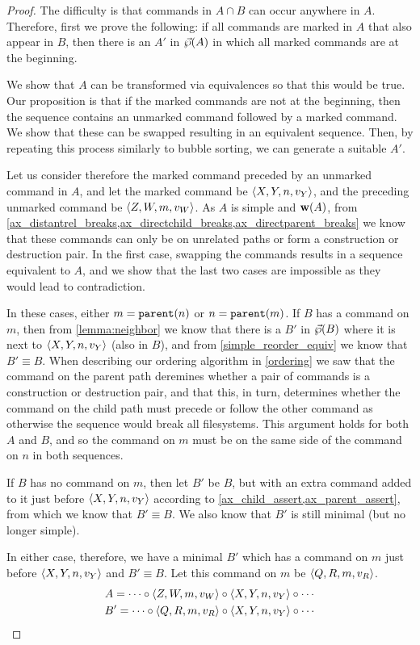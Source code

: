 \begin{proof}
The difficulty is that commands in $A\cap B$ can occur anywhere in $A$.
Therefore, first we prove the following:
if all commands are marked in $A$ that also appear in $B$,
then there is an $A'$ in $\vec{\wp}({A})$ in which all marked commands are at the beginning.

We show that $A$ can be transformed via equivalences so that this would be true.
Our proposition is that if the marked commands are not at the beginning, then
the sequence contains an unmarked command followed by a marked command.
We show that these can be swapped resulting in an equivalent sequence.
Then, by repeating this process similarly to bubble sorting, we can generate 
a suitable $A'$.

\medskip

Let us consider therefore the marked command preceded by an unmarked command in $A$,
and let the marked command be $\langle{X,Y,n,v_Y}\rangle$, 
and the preceding unmarked command be $\langle{Z,W,m,v_W}\rangle$.
As $A$ is simple and $\mathbf{w}({A})$, from 
\cref{ax_distantrel_breaks,ax_directchild_breaks,ax_directparent_breaks}
we know that these commands can only be on unrelated paths or form a construction or destruction pair.
In the first case, swapping the commands results in a sequence equivalent to $A$,
and we show that the last two cases are impossible as they would lead to contradiction.

In these cases, either $m=\mathtt{parent}(n)$ or $n=\mathtt{parent}(m)$.
If $B$ has a command on $m$, then
from \cref{lemma:neighbor}
we know that there is a $B'$ in $\vec{\wp}({B})$ where it is next to $\langle{X,Y,n,v_Y}\rangle$ (also in $B$),
and from \cref{simple_reorder_equiv} we know that $B'\equiv B$.
When describing our ordering algorithm in \cref{ordering} we saw
that the command on the parent path deremines whether a pair of commands
is a construction or destruction pair,
and that this, in turn, determines whether the command on the child path must
precede or follow the other command as otherwise the sequence would break all filesystems.
This argument holds for both $A$ and $B$, and so the command on $m$ must be on
the same side of the command on $n$ in both sequences.

If $B$ has no command on $m$, then let $B'$ be $B$, 
but with an extra command added to it just before $\langle{X,Y,n,v_Y}\rangle$
according to \cref{ax_child_assert,ax_parent_assert}, 
from which we know that $B'\equiv B$.
We also know that $B'$ is still minimal (but no longer simple).

In either case, therefore,
we have a minimal $B'$ which has a command on $m$ just before $\langle{X,Y,n,v_Y}\rangle$ and $B'\equiv B$.
Let this command on $m$ be $\langle{Q,R,m,v_R}\rangle$.
\begin{gather*}
A = \cdots\circ  \langle{Z,W,m,v_W}\rangle\circ  \langle{X,Y,n,v_Y}\rangle\circ  \cdots \\
B' = \cdots\circ  \langle{Q,R,m,v_R}\rangle\circ  \langle{X,Y,n,v_Y}\rangle\circ  \cdots
\end{gather*}


\end{proof}
